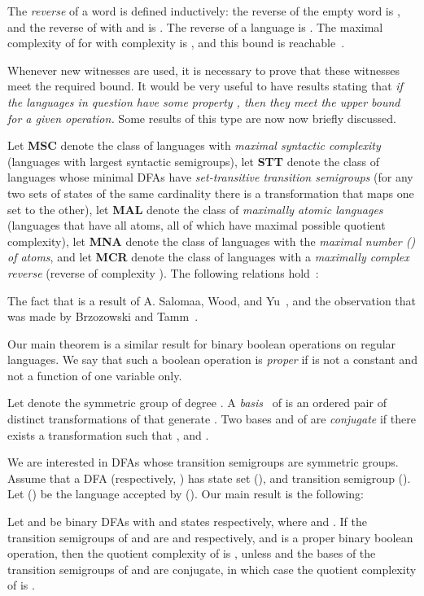 \documentclass{llncs}
\begin{document}
The \emph{reverse} of a word is defined inductively: the reverse of the empty word  is , and the reverse of  with  and  is .
The reverse of a language  is .
The maximal complexity of  for  with  complexity  is , and this bound is reachable~\cite{Mir66}.
\medskip

Whenever new witnesses are used, it is necessary to prove that these witnesses  meet the required bound. It would be very useful to have results stating that \emph{if the languages in question have some  property , then they meet the upper bound for a given operation.} 
Some results of this type are now now briefly discussed. 


Let \textbf{MSC} denote the class of languages with \emph{maximal syntactic complexity} (languages with largest syntactic semigroups), let \textbf{STT} denote the class of languages whose minimal DFAs have \emph{set-transitive transition semigroups} (for any two sets of states of the same cardinality there is a transformation that maps one set to the other), let \textbf{MAL} denote the class of \emph{maximally atomic languages} (languages that have all  atoms, all of which have maximal possible quotient complexity), let \textbf{MNA} denote the class of languages with the \emph{maximal number {\rm () of atoms}}, and let \textbf{MCR} denote the class of languages with a \emph{maximally complex reverse} (reverse of complexity ). The following relations hold~\cite{BrDa13a}:

The fact that \subset
is a result of  A. Salomaa, Wood, and Yu~\cite{SWY04},
and the observation that  was made by Brzozowski and Tamm~\cite{BrTa11}.


 Our main theorem is a similar result for binary boolean operations on regular languages. We say that such a boolean operation is \emph{proper} if  is not a constant  and not a function of one variable only. 

Let  denote the symmetric group of degree . 
A \emph{basis}~\cite{Pic39} of 
is an ordered pair  of distinct transformations of  that generate .
Two bases  and  of  are \emph{conjugate} if there exists a transformation  such that , and  .

We are interested in DFAs whose transition semigroups are symmetric groups.
Assume that a DFA  (respectively, ) has state set  (), and transition semigroup  ().
Let  () be the language accepted by  ().
Our main result is the following:
\begin{theorem}
\label{thm:main}
Let  and  be binary DFAs with  and  states respectively, where 
 and .
If  the transition semigroups of  and  are  and  respectively, and  is a proper binary boolean operation,
then the quotient complexity of  is , unless
 and the bases of the transition semigroups of  and  are conjugate, in which case the quotient complexity of  is .
\end{theorem}
\end{document}
